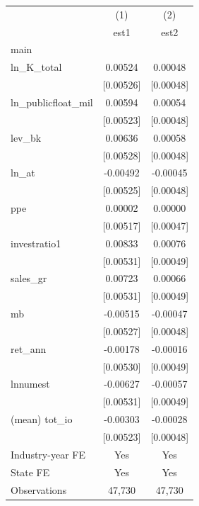 {
\def\sym#1{\ifmmode^{#1}\else\(^{#1}\)\fi}
\begin{tabular*}{/hsize}{@{\hskip\tabcolsep\extracolsep\fill}l*{2}{c}}
\hline\hline
                    &\multicolumn{1}{c}{(1)}&\multicolumn{1}{c}{(2)}\\
                    &\multicolumn{1}{c}{est1}&\multicolumn{1}{c}{est2}\\
\hline
main                &                     &                     \\
ln\_K\_total          &     0.00524         &     0.00048         \\
                    &   [0.00526]         &   [0.00048]         \\
[1em]
ln\_publicfloat\_mil  &     0.00594         &     0.00054         \\
                    &   [0.00523]         &   [0.00048]         \\
[1em]
lev\_bk              &     0.00636         &     0.00058         \\
                    &   [0.00528]         &   [0.00048]         \\
[1em]
ln\_at               &    -0.00492         &    -0.00045         \\
                    &   [0.00525]         &   [0.00048]         \\
[1em]
ppe                 &     0.00002         &     0.00000         \\
                    &   [0.00517]         &   [0.00047]         \\
[1em]
investratio1        &     0.00833         &     0.00076         \\
                    &   [0.00531]         &   [0.00049]         \\
[1em]
sales\_gr            &     0.00723         &     0.00066         \\
                    &   [0.00531]         &   [0.00049]         \\
[1em]
mb                  &    -0.00515         &    -0.00047         \\
                    &   [0.00527]         &   [0.00048]         \\
[1em]
ret\_ann             &    -0.00178         &    -0.00016         \\
                    &   [0.00530]         &   [0.00049]         \\
[1em]
lnnumest            &    -0.00627         &    -0.00057         \\
                    &   [0.00531]         &   [0.00049]         \\
[1em]
(mean) tot\_io       &    -0.00303         &    -0.00028         \\
                    &   [0.00523]         &   [0.00048]         \\
\hline
Industry-year FE    &         Yes         &         Yes         \\
State FE            &         Yes         &         Yes         \\
Observations        &      47,730         &      47,730         \\
\hline\hline
\end{tabular*}
}
